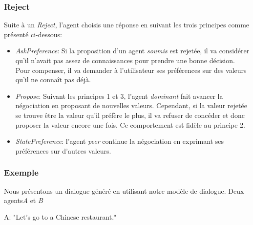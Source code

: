 	
	\subsubsection{Reject}
	Suite à un \emph{Reject}, l'agent choisis une réponse en suivant les trois principes comme présenté ci-dessous:
	\begin{itemize}
		\item \emph{AskPreference}: Si la proposition d'un agent \emph{soumis} est rejetée, il va considérer qu'il n'avait pas assez de connaissances pour prendre une bonne décision. Pour compenser, il va demander à l'utilisateur ses préférences sur des valeurs qu'il ne connaît pas déjà. 
		
		\item \emph{Propose}: Suivant les principes 1 et 3, l'agent \emph{dominant} fait avancer la négociation en proposant de nouvelles valeurs. Cependant, si la valeur rejetée se trouve être la valeur qu'il préfère le plus, il va refuser de concéder et donc proposer la valeur encore une fois. Ce comportement est fidèle au principe 2. 
		
		\item \emph{StatePreference}: l'agent \emph{peer} continue la négociation en exprimant ses préférences sur d'autres valeurs. 
	\end{itemize}	
	
	\subsubsection{Exemple}
	Nous présentons un dialogue généré en utilisant notre modèle de dialogue. Deux agents\textit{A} et \textit{B}
	
	
	A: "Let's go to a Chinese restaurant."
	
